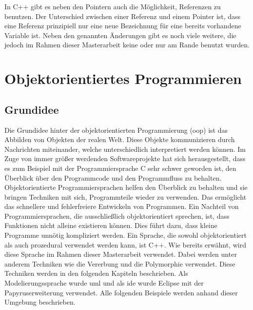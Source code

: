 In C++ gibt es neben den Pointern auch die Möglichkeit, Referenzen zu benutzen. Der Unterschied zwischen einer Referenz und einem Pointer ist, dass eine Referenz prinzipiell nur eine neue Bezeichnung für eine bereits vorhandene Variable ist.  Neben den genannten Änderungen gibt es noch viele weitere, die jedoch im Rahmen dieser Masterarbeit keine oder nur am Rande benutzt wurden.   
\\
\cite{SebastianMeyer.}
\cite{Krau.}
\cite{Prof.Dr.Ing.WolfgangSchroderPreikschat.}
\cite{HelmutErlenkotter.}
\section{Objektorientiertes Programmieren }

\subsection{Grundidee }
Die Grundidee hinter der objektorientierten Programmierung (\acs{oop}) ist das Abbilden von Objekten der realen Welt. Diese Objekte kommunizieren durch Nachrichten miteinander, welche unterschiedlich interpretiert werden können.  Im Zuge von immer größer werdenden Softwareprojekte hat sich herausgestellt, dass es zum Beispiel mit der Programmiersprache C sehr schwer geworden ist, den  Überblick über den Programmcode und den Programmfluss zu behalten. Objektorientierte Programmiersprachen helfen den Überblick zu behalten und sie bringen Techniken mit sich, Programmteile wieder zu verwenden. Das ermöglicht  das schnellere und fehlerfreiere Entwickeln von Programmen. Ein Nachteil von Programmiersprachen, die ausschließlich objektorientiert sprechen, ist, dass Funktionen nicht alleine existieren können. Dies führt dazu, dass kleine Programme unnötig kompliziert werden. Ein Sprache, die sowohl objektorientiert als auch prozedural verwendet werden kann, ist C++. Wie bereits erwähnt, wird diese Sprache im Rahmen dieser Masterarbeit verwendet.    
Dabei werden unter anderem  Techniken wie die Vererbung und die Polymorphie verwendet. Diese Techniken werden in den folgenden Kapiteln beschrieben. Als Modelierungssprache wurde \ac{uml} und als \ac{ide} wurde Eclipse mit der Papyruserweiterung verwendet. Alle folgenden Beispiele werden anhand dieser Umgebung beschrieben. \\
\cite{HelmutErlenkotter.}
\cite{Prof.Dr.AlfredIrber.}

